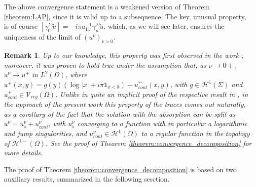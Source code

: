 \documentclass[report]{elsarticle}
\newtheorem{remark}[theorem]{Remark}
\numberwithin{theorem}{section}
\begin{document}
The above convergence statement is a weakened version of Theorem \ref{theorem:LAP}, since it is valid up to a subsequence. The key, unusual property, is of course $[\gamma_0^{\Sigma} \widetilde{u}]=-i\pi a_{11}^{-1}\gamma_n^{\Sigma}\widetilde{u}$, which, as we will see later, ensures the uniqueness of the limit of $(u^{\nu})_{\nu>0}$. 
\begin{remark}
	Up to our knowledge, this property was first observed in the work \cite{ciarlet_mk_peillon}; moreover, it was proven to hold true under the assumption that, as $\nu\rightarrow 0+$, $u^{\nu}\rightarrow u^+$ in $L^2(\Omega)$, where $u^+(x,y)=g(y)(\log|x|+i\pi\mathbb{1}_{x<0})+u^+_{cont}(x,y)$, with $g\in \mathcal{H}^1(\Sigma)$ and $u^+_{cont}\in \mathcal{V}_{reg}(\Omega)$. Unlike in quite an implicit proof of the respective result in \cite{ciarlet_mk_peillon}, in the approach of the present work this property of the traces comes out naturally, as a corollary of the fact that the solution with the absorption can be split as $u^{\nu}=u^{\nu}_{s}+u^{\nu}_{cont}$, with $u^{\nu}_{s}$ converging to a function with in particular a logarithmic and jump singularities, and $u^{\nu}_{cont}\in \mathcal{H}^1(\Omega)$ to a regular function in the topology of  $\mathcal{H}^{1-}(\Omega)$. See the proof of Theorem \ref{theorem:convergence_decomposition} for more details. 
\end{remark}
The proof of Theorem \ref{theorem:convergence_decomposition} is based on two auxiliary results, summarized in the following sesction.
\end{document}
